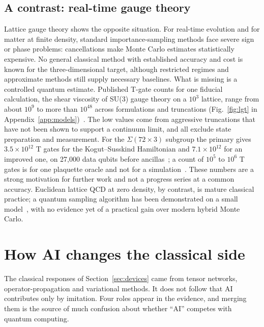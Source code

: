 \documentclass[10pt,a4paper]{article}
\begin{document}
\subsection{A contrast: real-time gauge theory}
\label{sec:gauge}
Lattice gauge theory shows the opposite situation. For real-time evolution and for matter at finite density, standard importance-sampling methods face severe sign or phase problems: cancellations make Monte Carlo estimates statistically expensive. No general classical method with established accuracy and cost is known for the three-dimensional target, although restricted regimes and approximate methods still supply necessary baselines. What is missing is a controlled quantum estimate. Published T-gate counts for one fiducial calculation, the shear viscosity of SU(3) gauge theory on a $10^3$ lattice, range from about $10^9$ to more than $10^{48}$ across formulations and truncations (Fig.~\ref{fig:lgt} in Appendix~\ref{app:models})~\cite{lamm2026,ciavarella2025,rhodes2024}. The low values come from aggressive truncations that have not been shown to support a continuum limit, and all exclude state preparation and measurement. For the $\Sigma(72\times3)$ subgroup the primary gives $3.5\times10^{12}$ T gates for the Kogut--Susskind Hamiltonian and $7.1\times10^{12}$ for an improved one, on 27{,}000 data qubits before ancillas~\cite{osorio2025}; a count of $10^5$ to $10^6$ T gates is for one plaquette oracle and not for a simulation~\cite{draper2026}. These numbers are a strong motivation for further work and not a progress series at a common accuracy. Euclidean lattice QCD at zero density, by contrast, is mature classical practice; a quantum sampling algorithm has been demonstrated on a small model~\cite{yamamoto2022}, with no evidence yet of a practical gain over modern hybrid Monte Carlo.
\section{How AI changes the classical side}
\label{sec:ai}

The classical responses of Section~\ref{sec:devices} came from tensor networks, operator-propagation and variational methods. It does not follow that AI contributes only by imitation. Four roles appear in the evidence, and merging them is the source of much confusion about whether ``AI'' competes with quantum computing.
\end{document}
